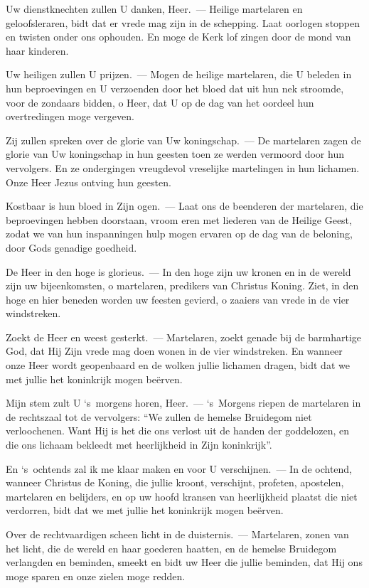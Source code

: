 \documentclass[12pt,twoside,a5paper]{article}
\begin{document}
\begin{halfparskip}
   Uw dienstknechten zullen U danken, Heer.~--- Heilige martelaren en geloofsleraren, bidt dat er vrede mag zijn in de schepping. Laat oorlogen stoppen en twisten onder ons ophouden. En moge de Kerk lof zingen door de mond van haar kinderen.

  Uw heiligen zullen U prijzen.~--- Mogen de heilige martelaren, die U beleden in hun beproevingen en U verzoenden door het bloed dat uit hun nek stroomde, voor de zondaars bidden, o Heer, dat U op de dag van het oordeel hun overtredingen moge vergeven.

  Zij zullen spreken over de glorie van Uw koningschap.~--- De martelaren zagen de glorie van Uw koningschap in hun geesten toen ze werden vermoord door hun vervolgers. En ze ondergingen vreugdevol vreselijke martelingen in hun lichamen. Onze Heer Jezus ontving hun geesten.

  Kostbaar is hun bloed in Zijn ogen.~--- Laat ons de beenderen der martelaren, die beproevingen hebben doorstaan, vroom eren met liederen van de Heilige Geest, zodat we van hun inspanningen hulp mogen ervaren op de dag van de beloning, door Gods genadige goedheid.

  De Heer in den hoge is glorieus.~--- In den hoge zijn uw kronen en in de wereld zijn uw bijeenkomsten, o martelaren, predikers van Christus Koning. Ziet, in den hoge en hier beneden worden uw feesten gevierd, o zaaiers van vrede in de vier windstreken.

  Zoekt de Heer en weest gesterkt.~--- Martelaren, zoekt genade bij de barmhartige God, dat Hij Zijn vrede mag doen wonen in de vier windstreken. En wanneer onze Heer wordt geopenbaard en de wolken jullie lichamen dragen, bidt dat we met jullie het koninkrijk mogen beërven.

  Mijn stem zult U `s~morgens horen, Heer.~--- `s~Morgens riepen de martelaren in de rechtszaal tot de vervolgers: ``We zullen de hemelse Bruidegom niet verloochenen. Want Hij is het die ons verlost uit de handen der goddelozen, en die ons lichaam bekleedt met heerlijkheid in Zijn koninkrijk''.

  En `s~ochtends zal ik me klaar maken en voor U verschijnen.~--- In de ochtend, wanneer Christus de Koning, die jullie kroont, verschijnt, profeten, apostelen, martelaren en belijders, en op uw hoofd kransen van heerlijkheid plaatst die niet verdorren, bidt dat we met jullie het koninkrijk mogen beërven.

  Over de rechtvaardigen scheen licht in de duisternis.~--- Martelaren, zonen van het licht, die de wereld en haar goederen haatten, en de hemelse Bruidegom verlangden en beminden, smeekt en bidt uw Heer die jullie beminden, dat Hij ons moge sparen en onze zielen moge redden.


\end{halfparskip}
\end{document}
